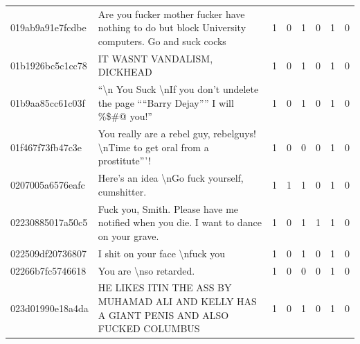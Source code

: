 \begin{table}[htb!]
{\begin{minipage}{0.88\textheight}
\begin{threeparttable}
\begin{tabularx}{\textwidth}{L{0.95} L{6.25} C{0.135} C{0.135} C{0.135} C{0.135} C{0.135} C{0.135}}
                    019ab9a91e7fcdbe & Are you fucker mother fucker have nothing to do but block University computers. Go and suck cocks                                & 1           & 0           & 1           & 0           & 1           & 0           \\
                    01b1926bc5c1cc78 & IT WASNT VANDALISM, DICKHEAD                                                                                                     & 1           & 0           & 1           & 0           & 1           & 0           \\
                    01b9aa85cc61c03f & ``\textbackslash n You Suck \textbackslash nIf you don't undelete the page ````Barry Dejay'''' I will \%\$\#@ you!''             & 1           & 0           & 1           & 0           & 1           & 0           \\
                    01f467f73fb47c3e & You really are a rebel guy, rebelguys! \textbackslash nTime to get oral from a prostitute'''!                                    & 1           & 0           & 0           & 0           & 1           & 0           \\
                    0207005a6576eafc & Here's an idea \textbackslash nGo fuck yourself, cumshitter.                                                                     & 1           & 1           & 1           & 0           & 1           & 0           \\
                    02230885017a50c5 & Fuck you, Smith. Please have me notified when you die. I want to dance on your grave.                                            & 1           & 0           & 1           & 1           & 1           & 0           \\
                    022509df20736807 & I shit on your face \textbackslash nfuck you                                                                                     & 1           & 0           & 1           & 0           & 1           & 0           \\
                    02266b7fc5746618 & You are \textbackslash nso retarded.                                                                                             & 1           & 0           & 0           & 0           & 1           & 0           \\
                    023d01990e18a4da & HE LIKES ITIN THE ASS BY MUHAMAD ALI AND KELLY HAS A GIANT PENIS AND ALSO FUCKED COLUMBUS                                        & 1           & 0           & 1           & 0           & 1           & 0           \\

\end{tabularx}
\end{threeparttable}
\end{minipage}}
\end{table}
